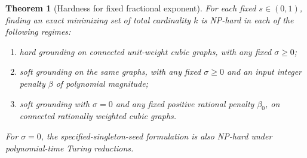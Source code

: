 \documentclass[11pt]{article}
\newtheorem{theorem}{Theorem}
\begin{document}
\begin{theorem}[Hardness for fixed fractional exponent]\label{thm:hardness}
For each fixed $s\in(0,1)$, finding an exact minimizing set of total
cardinality $k$ is NP-hard in each of the following regimes:
\begin{enumerate}
\item hard grounding on connected unit-weight cubic graphs, with any
fixed $\sigma\geq0$;
\item soft grounding on the same graphs, with any fixed $\sigma\geq0$
and an input integer penalty $\beta$ of polynomial magnitude;
\item soft grounding with $\sigma=0$ and any fixed positive rational
penalty $\beta_0$, on connected rationally weighted cubic graphs.
\end{enumerate}
For $\sigma=0$, the specified-singleton-seed formulation is also
NP-hard under polynomial-time Turing reductions.
\end{theorem}
\end{document}
